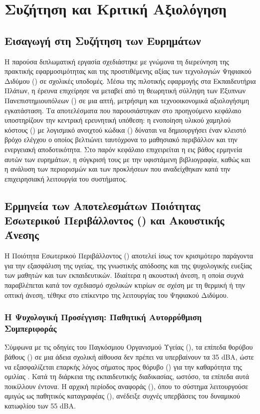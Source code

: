 \chapter{Συζήτηση και Κριτική Αξιολόγηση}

\section{Εισαγωγή στη Συζήτηση των Ευρημάτων}
Η παρούσα διπλωματική εργασία σχεδιάστηκε με γνώμονα τη διερεύνηση της πρακτικής εφαρμοσιμότητας και της προστιθέμενης αξίας των τεχνολογιών Ψηφιακού Διδύμου () σε σχολικές υποδομές. Μέσω της πιλοτικής εφαρμογής στα Εκπαιδευτήρια Πλάτων, η έρευνα επιχείρησε να μεταβεί από τη θεωρητική σύλληψη των Έξυπνων Πανεπιστημιουπόλεων () σε μια απτή, μετρήσιμη και τεχνοοικονομικά αξιολογήσιμη εγκατάσταση. Τα αποτελέσματα που παρουσιάστηκαν στο προηγούμενο κεφάλαιο υποστηρίζουν την κεντρική ερευνητική υπόθεση: η ενοποίηση υλικού χαμηλού κόστους () με λογισμικό ανοιχτού κώδικα () δύναται να δημιουργήσει έναν κλειστό βρόχο ελέγχου ο οποίος βελτιώνει ταυτόχρονα το μαθησιακό περιβάλλον και την ενεργειακή αποδοτικότητα. Στο παρόν κεφάλαιο επιχειρείται η εις βάθος ερμηνεία αυτών των ευρημάτων, η σύγκρισή τους με την υφιστάμενη βιβλιογραφία, καθώς και η ανάλυση των περιορισμών και των προκλήσεων που αναδείχθηκαν κατά την επιχειρησιακή λειτουργία του συστήματος.

\section{Ερμηνεία των Αποτελεσμάτων Ποιότητας Εσωτερικού Περιβάλλοντος () και Ακουστικής Άνεσης}
Η Ποιότητα Εσωτερικού Περιβάλλοντος () αποτελεί ίσως τον κρισιμότερο παράγοντα για την εξασφάλιση της υγείας, της γνωστικής απόδοσης και της ψυχολογικής ευεξίας των μαθητών και των εκπαιδευτικών. Ιδιαίτερα η ακουστική άνεση, η οποία συχνά παραβλέπεται κατά τον σχεδιασμό σχολικών κτιρίων σε σχέση με τη θερμική ή την οπτική άνεση, τέθηκε στο επίκεντρο της λειτουργίας του Ψηφιακού Διδύμου.

\subsection{Η Ψυχολογική Προσέγγιση: Παθητική Αυτορρύθμιση Συμπεριφοράς}
Σύμφωνα με τις οδηγίες του Παγκόσμιου Οργανισμού Υγείας (), τα επίπεδα θορύβου βάθους () σε μια άδεια σχολική αίθουσα δεν πρέπει να υπερβαίνουν τα 35 dBA, ώστε να εξασφαλίζεται επαρκής λόγος σήματος προς θόρυβο () για την καθαρότητα της ομιλίας \cite{WHO2015, Kephalopoulos2015}. Κατά τη διάρκεια της εκπαιδευτικής διαδικασίας, ωστόσο, τα επίπεδα αυτά ποικίλλουν έντονα. Η αρχική περίοδος αναφοράς (), όπου το σύστημα λειτουργούσε αμιγώς ως παθητικός καταγραφέας (), ανέδειξε συχνές υπερβάσεις του δυναμικού κατωφλίου των 55 dBA.

